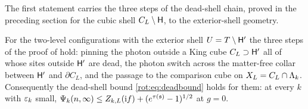The first statement carries the three steps of the dead-shell chain, proved in the preceding section for the cubic shell $C_L\setminus\mathsf H$, to the exterior-shell geometry.

\begin{proposition}\label{rot:hyp:DS}
For the two-level configurations with the exterior shell $U=T\setminus\mathsf H'$ the three steps of the proof of  hold: pinning the photon outside a King cube $C_L\supset\mathsf H'$ all of whose sites outside $\mathsf H'$ are dead, the photon switch across the matter-free collar between $\mathsf H'$ and $\partial C_L$, and the passage to the comparison cube on $X_L=C_L\cap\Lambda_k$. Consequently the dead-shell bound \eqref{rot:eq:deadbound} holds for them: at every $k$ with $\varepsilon_k$ small, $\Psi_k(n,\infty)\le Z_{k,L}(\mathrm if)+(e^{\tau(\mathfrak s)}-1)^{1/2}$ at $g=0$.
\end{proposition}



